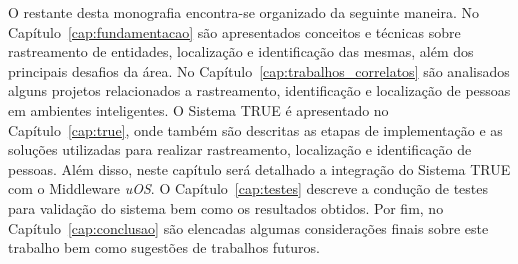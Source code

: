 O restante desta monografia encontra-se organizado da seguinte maneira. No
Capítulo~\ref{cap:fundamentacao} são apresentados conceitos e técnicas sobre
rastreamento de entidades, localização e identificação das mesmas, além dos principais desafios da área. No
Capítulo~\ref{cap:trabalhos_correlatos} são analisados alguns projetos
relacionados a rastreamento, identificação e localização de pessoas em
ambientes inteligentes. O Sistema TRUE é apresentado no Capítulo~\ref{cap:true}, onde também são descritas as etapas de implementação e as soluções utilizadas para realizar rastreamento, localização e identificação de pessoas. Além disso, neste capítulo será detalhado a integração do Sistema TRUE com o Middleware \textit{uOS}. O Capítulo~\ref{cap:testes} descreve a condução de testes para validação do sistema bem como os resultados obtidos. Por fim, no Capítulo~\ref{cap:conclusao} são elencadas algumas considerações finais sobre este trabalho bem como sugestões de trabalhos futuros.




